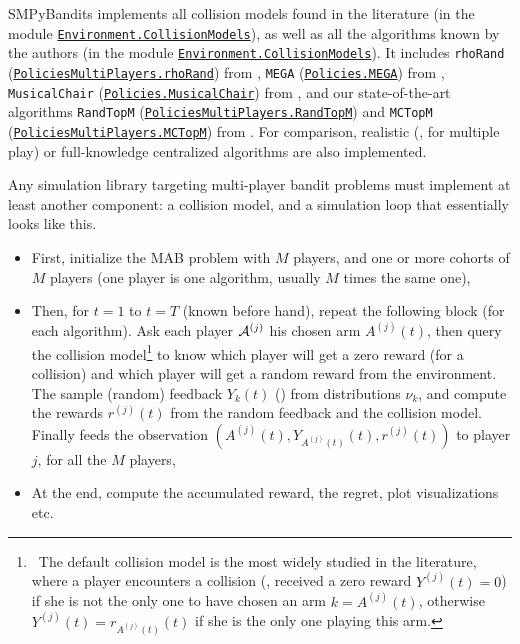 SMPyBandits implements all collision models found in the literature (in the module \texttt{\href{https://SMPyBandits.GitHub.io/docs/Environment.CollisionModels.html}{Environment.CollisionModels}}), as well as all the algorithms known by the authors (in the module \texttt{\href{https://SMPyBandits.GitHub.io/docs/Environment.CollisionModels.html}{Environment.CollisionModels}}).
%
It includes
\texttt{rhoRand} (\texttt{\href{https://SMPyBandits.GitHub.io/docs/PoliciesMultiPlayers.rhoRand.html}{PoliciesMultiPlayers.rhoRand}}) from \cite{Anandkumar11},
\texttt{MEGA} (\texttt{\href{https://SMPyBandits.GitHub.io/docs/Policies.MEGA.html}{Policies.MEGA}}) from \cite{Avner15},
\texttt{MusicalChair} (\texttt{\href{https://SMPyBandits.GitHub.io/docs/Policies.MusicalChair.html}{Policies.MusicalChair}}) from \cite{Rosenski16},
and our state-of-the-art algorithms
\texttt{RandTopM} (\texttt{\href{https://SMPyBandits.GitHub.io/docs/PoliciesMultiPlayers.RandTopM.html}{PoliciesMultiPlayers.RandTopM}}) and
\texttt{MCTopM} (\texttt{\href{https://SMPyBandits.GitHub.io/docs/PoliciesMultiPlayers.MCTopM.html}{PoliciesMultiPlayers.MCTopM}}) from \cite{Besson2018ALT}.
For comparison, realistic (\eg, \UCB{} for multiple play) or full-knowledge centralized algorithms are also implemented.

Any simulation library targeting multi-player bandit problems must implement at least another component:
a collision model, and a simulation loop that essentially looks like this.
\begin{itemize}
    \item First, initialize the MAB problem with $M$ players, and one or more cohorts of $M$ players (one player is one algorithm, usually $M$ times the same one),
    \item Then, for $t=1$ to $t=T$ (known before hand), repeat the following block (for each algorithm). Ask each player $\mathcal{A}^{(j)}$ his chosen arm $A^{(j)}(t)$, then query the collision model\footnote{~The default collision model is the most widely studied in the literature, where a player encounters a collision (\ie, received a zero reward $Y^{(j)}(t)=0$) if she is not the only one to have chosen an arm $k=A^{(j)}(t)$, otherwise $Y^{(j)}(t)=r_{A^{(j)}(t)}(t)$ if she is the only one playing this arm.} to know which player will get a zero reward (for a collision) and which player will get a random reward from the environment. The
    sample (random) feedback $Y_k(t)$ (\iid) from distributions $\nu_{k}$, and compute the rewards $r^{(j)}(t)$ from the random feedback and the collision model. Finally feeds the observation $(A^{(j)}(t), Y_{A^{(j)}(t)}(t), r^{(j)}(t))$ to player $j$, for all the $M$ players,
    \item At the end, compute the accumulated reward, the regret, plot visualizations etc.
\end{itemize}


